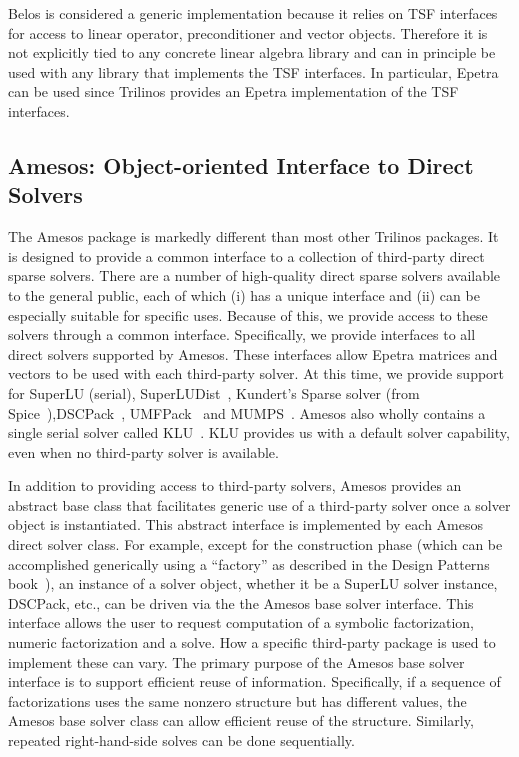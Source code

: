 \documentclass[12pt,relax]{TPA}
\begin{document}
Belos is considered a generic implementation because it relies on TSF
interfaces for access to linear operator, preconditioner and vector
objects.  Therefore it is not explicitly tied to any concrete linear
algebra library and can in principle be used with any library that
implements the TSF interfaces.  In particular, Epetra can be used
since Trilinos provides an Epetra implementation of the TSF
interfaces.

\subsection{Amesos: Object-oriented Interface to Direct Solvers}

The Amesos package is markedly different than most other Trilinos
packages.  It is designed to provide a common interface to a
collection of third-party direct sparse solvers.
There are a number of high-quality direct sparse
solvers available to the general public, each of which (i) has a unique
interface and (ii) can be especially suitable for specific uses.
Because of this, we provide access to these solvers through a common
interface.  Specifically, we provide interfaces to all direct solvers
supported by Amesos.  These interfaces allow Epetra matrices and
vectors to be used with each third-party solver.  At this time, we
provide support for SuperLU (serial), SuperLUDist~\cite{superlu-home-page}, 
Kundert's Sparse solver (from
Spice~\cite{spice-home-page}),DSCPack~\cite{dscpack-home-page}, UMFPack~\cite{umfpack-home-page}
and MUMPS~\cite{mumps-home-page}.  Amesos also wholly contains a single
serial solver called KLU~\cite{KLU}.  KLU provides us with a default
solver capability, even when no third-party solver is available.  

In addition to providing access to third-party solvers, Amesos
provides an abstract base class that facilitates generic use of a
third-party solver once a solver object is instantiated.  This
abstract interface is implemented by each Amesos direct solver class.
For example, except for the construction phase (which can be
accomplished generically using a ``factory'' as described in the
Design Patterns book~\cite{Gamma}), an instance of a solver object,
whether it be a SuperLU solver instance, DSCPack, etc., can be driven
via the the Amesos base solver interface.  This interface allows the
user to request computation of a symbolic factorization, numeric
factorization and a solve.  How a specific third-party package is used
to implement these can vary.  The primary purpose of the Amesos base
solver interface is to support efficient reuse of information.
Specifically, if a sequence of factorizations uses the same nonzero
structure but has different values, the Amesos base solver class can
allow efficient reuse of the structure.  Similarly, repeated
right-hand-side solves can be done sequentially.
\end{document}
